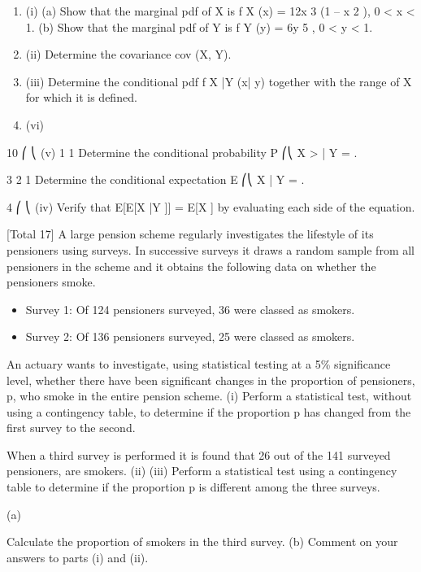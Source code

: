 \documentclass[a4paper,12pt]{article}
\begin{document}
\begin{enumerate}
\begin{enumerate}
\item (i)
(a)
Show that the marginal pdf of X is
f X   (x) = 12x 3 (1 – x 2 ), 0 <
x < 1.
(b)
Show that the marginal pdf of Y is f Y   (y) = 6y 5 , 0 < y < 1.


\item (ii) Determine the covariance cov (X, Y).
\item 
(iii) Determine the conditional pdf f X |Y (x| y) together with the range of X for which
it is defined. 
\item 

(vi)

\end{enumerate}
10
⎛
⎝
(v)
1
1
Determine the conditional probability P ⎛⎝ X > | Y = .

3
2
1
Determine the conditional expectation E ⎛⎝ X | Y = .

4   
⎛
⎝
(iv)
Verify that E[E[X |Y ]] = E[X ] by evaluating each side of the equation.


[Total 17]
A large pension scheme regularly investigates the lifestyle of its pensioners using surveys. In successive surveys it draws a random sample from all pensioners in the
scheme and it obtains the following data on whether the pensioners smoke.
\begin{itemize}
    \item Survey 1: Of 124 pensioners surveyed, 36 were classed as smokers.
\item Survey 2: Of 136 pensioners surveyed, 25 were classed as smokers.
\end{itemize}

An actuary wants to investigate, using statistical testing at a 5\% significance level,
whether there have been significant changes in the proportion of pensioners, p, who
smoke in the entire pension scheme.
(i)
Perform a statistical test, without using a contingency table, to determine if the
proportion p has changed from the first survey to the second.


When a third survey is performed it is found that 26 out of the 141 surveyed
pensioners, are smokers.
(ii)
(iii)
Perform a statistical test using a contingency table to determine if the
proportion p is different among the three surveys.

(a)

Calculate the proportion of smokers in the third survey.
(b)
Comment on your answers to parts (i) and (ii).

\end{enumerate}
\newpage
\end{document}
